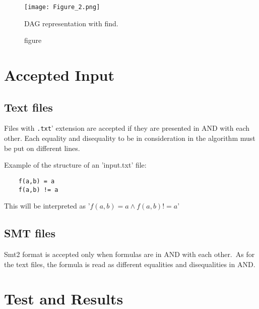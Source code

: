 \documentclass[11pt]{article}
\begin{document}
\begin{figure}[!htpb]
    \centering
    \texttt{[image: Figure\_2.png]}
    \caption{figure}{DAG representation with find.}
    \label{fig:enter-label}
\end{figure}

\newpage
\section{Accepted Input}

\subsection{Text files}

Files with \texttt{.txt}' extension are accepted if they are presented in AND with each other.
Each equality and disequality to be in consideration in the algorithm must be put on different lines.

Example of the structure of an 'input.txt' file:

\begin{verbatim}
    f(a,b) = a
    f(a,b) != a
\end{verbatim}

This will be interpreted as '$f(a,b) = a \land f(a,b) != a$'

\subsection{SMT files}

Smt2 format is accepted only when formulas are in AND with each other.\
As for the text files, the formula is read as different equalities and disequalities in AND.

\section{Test and Results}
\end{document}

